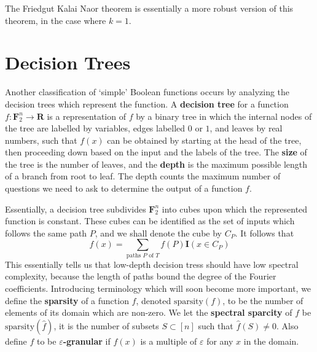The Friedgut Kalai Naor theorem is essentially a more robust version of this theorem, in the case where $k = 1$.




\section{Decision Trees}

Another classification of `simple' Boolean functions occurs by analyzing the decision trees which represent the function. A {\bf decision tree} for a function $f: \mathbf{F}_2^n \to \mathbf{R}$ is a representation of $f$ by a binary tree in which the internal nodes of the tree are labelled by variables, edges labelled $0$ or $1$, and leaves by real numbers, such that $f(x)$ can be obtained by starting at the head of the tree, then proceeding down based on the input and the labels of the tree. The {\bf size} of the tree is the number of leaves, and the {\bf depth} is the maximum possible length of a branch from root to leaf. The depth counts the maximum number of questions we need to ask to determine the output of a function $f$.

Essentially, a decision tree subdivides $\mathbf{F}_2^n$ into cubes upon which the represented function is constant. These cubes can be identified as the set of inputs which follows the same path $P$, and we shall denote the cube by $C_P$. It follows that
%
\[ f(x) = \sum_{\text{paths $P$ of $T$}} f(P) \mathbf{I}(x \in C_P) \]
%
This essentially tells us that low-depth decision tress should have low spectral complexity, because the length of paths bound the degree of the Fourier coefficients. Introducing terminology which will soon become more important, we define the {\bf sparsity} of a function $f$, denoted $\text{sparsity}(f)$, to be the number of elements of its domain which are non-zero. We let the {\bf spectral sparcity} of $f$ be $\text{sparsity}(\widehat{f})$, it is the number of subsets $S \subset [n]$ such that $\widehat{f}(S) \neq 0$. Also define $f$ to be {\bf $\varepsilon$-granular} if $f(x)$ is a multiple of $\varepsilon$ for any $x$ in the domain.

